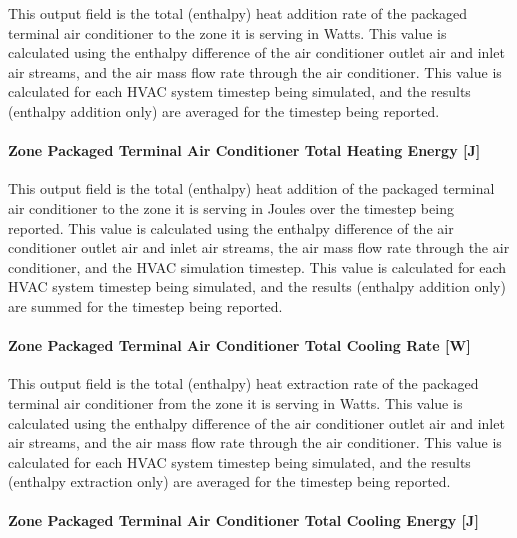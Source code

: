 This output field is the total (enthalpy) heat addition rate of the packaged terminal air conditioner to the zone it is serving in Watts. This value is calculated using the enthalpy difference of the air conditioner outlet air and inlet air streams, and the air mass flow rate through the air conditioner. This value is calculated for each HVAC system timestep being simulated, and the results (enthalpy addition only) are averaged for the timestep being reported.

\paragraph{Zone Packaged Terminal Air Conditioner Total Heating Energy {[}J{]}}\label{zone-packaged-terminal-air-conditioner-total-heating-energy-j}

This output field is the total (enthalpy) heat addition of the packaged terminal air conditioner to the zone it is serving in Joules over the timestep being reported. This value is calculated using the enthalpy difference of the air conditioner outlet air and inlet air streams, the air mass flow rate through the air conditioner, and the HVAC simulation timestep. This value is calculated for each HVAC system timestep being simulated, and the results (enthalpy addition only) are summed for the timestep being reported.

\paragraph{Zone Packaged Terminal Air Conditioner Total Cooling Rate {[}W{]}}\label{zone-packaged-terminal-air-conditioner-total-cooling-rate-w}

This output field is the total (enthalpy) heat extraction rate of the packaged terminal air conditioner from the zone it is serving in Watts. This value is calculated using the enthalpy difference of the air conditioner outlet air and inlet air streams, and the air mass flow rate through the air conditioner. This value is calculated for each HVAC system timestep being simulated, and the results (enthalpy extraction only) are averaged for the timestep being reported.

\paragraph{Zone Packaged Terminal Air Conditioner Total Cooling Energy {[}J{]}}\label{zone-packaged-terminal-air-conditioner-total-cooling-energy-j}

